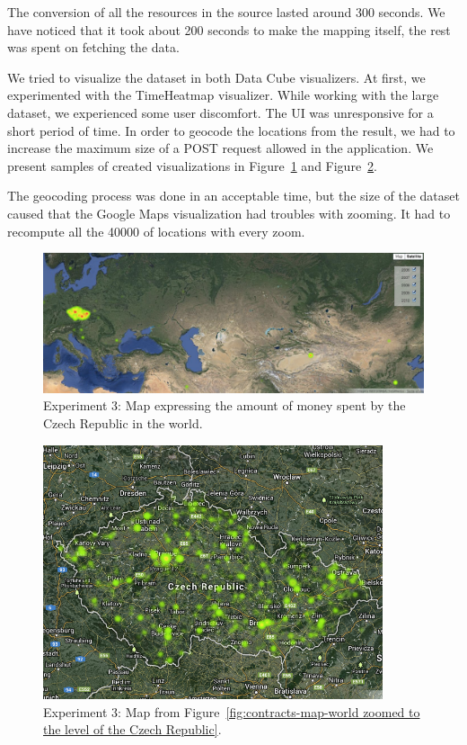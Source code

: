 The conversion of all the resources in the source lasted around 300 seconds. We 
have noticed that it took about 200 seconds to make the mapping itself, the rest 
was spent on fetching the data.

We tried to visualize the dataset in both Data Cube visualizers. At first, we experimented 
with the TimeHeatmap visualizer. While working with the large dataset, we 
experienced some user discomfort. The UI was unresponsive for a short period of time. 
In order to geocode the locations from the result, we had to increase the 
maximum size of a POST request allowed in the application. We present samples of 
created visualizations in Figure~\ref{fig:contracts-map-world} and 
Figure~\ref{fig:contracts-map-zoomed}.

The geocoding process was done in an acceptable time, but the size of the 
dataset caused that the Google Maps visualization had troubles with zooming. It 
had to recompute all the 40000 of locations with every zoom.

\begin{figure}
  \centering
  \includegraphics[width=140mm]{img/contracts-map-world.png}
  \caption{Experiment 3: Map expressing the amount of money spent by the Czech Republic in the world.}
  \label{fig:contracts-map-world}
\end{figure}

\begin{figure}
  \centering
  \includegraphics[width=100mm]{img/contracts-map-zoomed.png}
  \caption{Experiment 3: Map from Figure~\ref{fig:contracts-map-world zoomed to the level of the Czech Republic}.}
  \label{fig:contracts-map-zoomed}
\end{figure}

